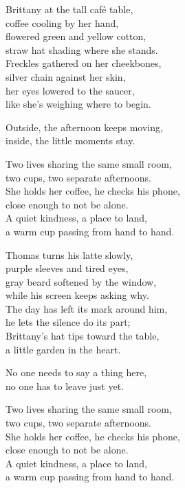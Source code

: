 \begin{lyrics}
Brittany at the tall café table,\\
coffee cooling by her hand,\\
flowered green and yellow cotton,\\
straw hat shading where she stands.\\
Freckles gathered on her cheekbones,\\
silver chain against her skin,\\
her eyes lowered to the saucer,\\
like she’s weighing where to begin.

Outside, the afternoon keeps moving,\\
inside, the little moments stay.

Two lives sharing the same small room,\\
two cups, two separate afternoons.\\
She holds her coffee, he checks his phone,\\
close enough to not be alone.\\
A quiet kindness, a place to land,\\
a warm cup passing from hand to hand.

Thomas turns his latte slowly,\\
purple sleeves and tired eyes,\\
gray beard softened by the window,\\
while his screen keeps asking why.\\
The day has left its mark around him,\\
he lets the silence do its part;\\
Brittany’s hat tips toward the table,\\
a little garden in the heart.

No one needs to say a thing here,\\
no one has to leave just yet.

Two lives sharing the same small room,\\
two cups, two separate afternoons.\\
She holds her coffee, he checks his phone,\\
close enough to not be alone.\\
A quiet kindness, a place to land,\\
a warm cup passing from hand to hand.


\end{lyrics}
